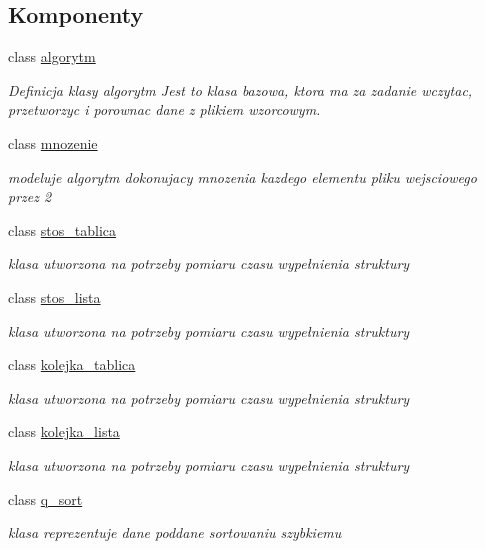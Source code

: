 \subsection*{\-Komponenty}
\begin{DoxyCompactItemize}
\item 
class \hyperlink{classalgorytm}{algorytm}
\begin{DoxyCompactList}\small\item\em \-Definicja klasy algorytm \-Jest to klasa bazowa, ktora ma za zadanie wczytac, przetworzyc i porownac dane z plikiem wzorcowym. \end{DoxyCompactList}\item 
class \hyperlink{classmnozenie}{mnozenie}
\begin{DoxyCompactList}\small\item\em modeluje algorytm dokonujacy mnozenia kazdego elementu pliku wejsciowego przez 2 \end{DoxyCompactList}\item 
class \hyperlink{classstos__tablica}{stos\-\_\-tablica}
\begin{DoxyCompactList}\small\item\em klasa utworzona na potrzeby pomiaru czasu wypełnienia struktury \end{DoxyCompactList}\item 
class \hyperlink{classstos__lista}{stos\-\_\-lista}
\begin{DoxyCompactList}\small\item\em klasa utworzona na potrzeby pomiaru czasu wypełnienia struktury \end{DoxyCompactList}\item 
class \hyperlink{classkolejka__tablica}{kolejka\-\_\-tablica}
\begin{DoxyCompactList}\small\item\em klasa utworzona na potrzeby pomiaru czasu wypełnienia struktury \end{DoxyCompactList}\item 
class \hyperlink{classkolejka__lista}{kolejka\-\_\-lista}
\begin{DoxyCompactList}\small\item\em klasa utworzona na potrzeby pomiaru czasu wypełnienia struktury \end{DoxyCompactList}\item 
class \hyperlink{classq__sort}{q\-\_\-sort}
\begin{DoxyCompactList}\small\item\em klasa reprezentuje dane poddane sortowaniu szybkiemu \end{DoxyCompactList}\item 

\end{DoxyCompactItemize}
